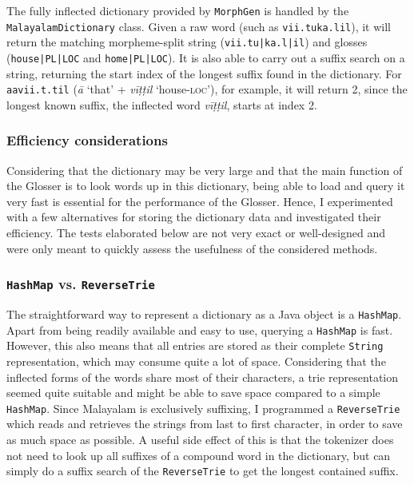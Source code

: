 \documentclass[a4paper]{article}
\newcommand{\typ}[1]{\texttt{#1}}
\newcommand{\afx}[1]{\textsc{#1}}
\begin{document}
The fully inflected dictionary provided by \typ{MorphGen} is handled by the \typ{MalayalamDictionary} class. Given a raw word (such as \typ{vii.tuka.lil}), it will return the matching morpheme-split string (\typ{vii.tu|ka.l|il}) and glosses (\typ{house|PL|LOC} and \typ{home|PL|LOC}). It is also able to carry out a suffix search on a string, returning the start index of the longest suffix found in the dictionary. For \typ{aavii.t.til} (\textit{ā} `that' + \textit{vīṭṭil} `house-\afx{loc}'), for example, it will return 2, since the longest known suffix, the inflected word \textit{vīṭṭil}, starts at index 2.

\subsubsection{Efficiency considerations}

Considering that the dictionary may be very large and that the main function of the Glosser is to look words up in this dictionary, being able to load and query it very fast is essential for the performance of the Glosser. Hence, I experimented with a few alternatives for storing the dictionary data and investigated their efficiency. The tests elaborated below are not very exact or well-designed and were only meant to quickly assess the usefulness of the considered methods.

\subsubsection*{\typ{HashMap} vs. \typ{ReverseTrie}}

The straightforward way to represent a dictionary as a Java object is a \typ{HashMap}. Apart from being readily available and easy to use, querying a \typ{HashMap} is fast. However, this also means that all entries are stored as their complete \typ{String} representation, which may consume quite a lot of space. Considering that the inflected forms of the words share most of their characters, a trie representation seemed quite suitable and might be able to save space compared to a simple \typ{HashMap}. Since Malayalam is exclusively suffixing, I programmed a \typ{ReverseTrie} which reads and retrieves the strings from last to first character, in order to save as much space as possible. A useful side effect of this is that the tokenizer does not need to look up all suffixes of a compound word in the dictionary, but can simply do a suffix search of the \typ{ReverseTrie} to get the longest contained suffix.
\end{document}
